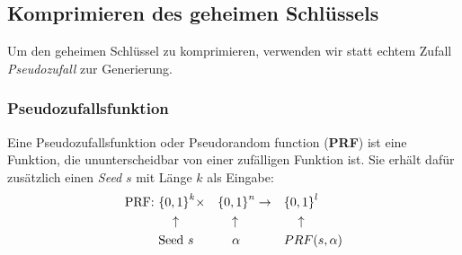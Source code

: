 \documentclass[12pt,A4]{extarticle}
\begin{document}
\subsection{Komprimieren des geheimen Schlüssels}
Um den geheimen Schlüssel zu komprimieren, verwenden wir statt echtem Zufall \textit{Pseudozufall} zur Generierung.
\subsubsection{Pseudozufallsfunktion}
Eine Pseudozufallsfunktion oder Pseudorandom function (\textbf{PRF}) ist eine Funktion, die ununterscheidbar von einer zufälligen Funktion ist. Sie erhält dafür zusätzlich einen \textit{Seed} $s$ mit Länge $k$ als Eingabe:
\begin{alignat*}{5}
  \text{PRF: } & {\{0,1\}}^k \times      &  & {\{0,1\}}^n \rightarrow &  & {\{0,1\}}^l             \\
               & \hspace{0.3cm} \uparrow &  & \hspace{0.3cm}\uparrow  &  & \hspace{0.3cm} \uparrow \\
               & \text{Seed } s          &  & \hspace{0.4cm}\alpha    &  & PRF(s, \alpha)
\end{alignat*}
\end{document}
